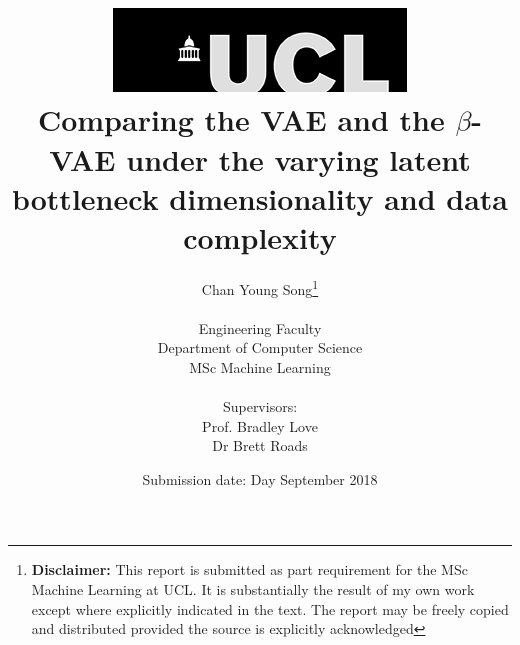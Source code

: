 \title{
    {\includegraphics[scale=.5]{imgs/ucl_logo.png}}\\
    {{\Huge Comparing the VAE and the $\beta$-VAE under the varying latent bottleneck dimensionality and data complexity}}\\
}
\date{Submission date: Day September 2018}

\author{
    Chan Young Song\thanks{
        {\bf Disclaimer:}
        This report is submitted as part requirement for the MSc Machine Learning at UCL. It is
        substantially the result of my own work except where explicitly indicated in the text.
        The report may be freely copied and distributed provided the source is explicitly acknowledged
    }
    \\ \\
    Engineering Faculty\\
    Department of Computer Science\\
    MSc Machine Learning\\ \\
    Supervisors:\\
    Prof. Bradley Love\\
    Dr Brett Roads
}
